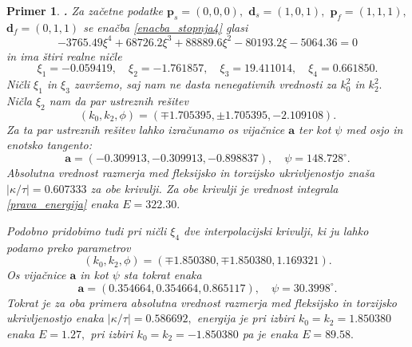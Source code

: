 \documentclass[12pt,a4paper,twoside]{article}
\theoremstyle{definition} %
\theoremstyle{plain} %
\theoremstyle{primerstyle}
\newtheorem{primer}[definicija]{Primer}
\numberwithin{equation}{section}  %
\newcommand{\aV}{\mathbf{a}}
\newcommand{\dV}{\mathbf{d}}
\newcommand{\pV}{\mathbf{p}}
\begin{document}
\begin{primer}
	\label{interpolacija_primer}
	\textbf{. }Za začetne podatke $\pV_s=(0,0,0),$ $\dV_s=(1,0,1),$ $\pV_f=(1,1,1),$ $\dV_f=(0,1,1)$ se enačba \eqref{enacba_stopnja4} glasi
	\begin{equation}
		\label{primer_enacbast4}
		-3765.49\xi^4+68726.2\xi^3+88889.6\xi^2-80193.2\xi-5064.36=0
	\end{equation}
	in ima štiri realne ničle
	\begin{equation}
		\label{hermit_nicle}
		\xi_1=-0.059419,\quad\xi_2=-1.761857,\quad\xi_3=19.411014,\quad\xi_4=0.661850.
	\end{equation}
	Ničli $\xi_1$ in $\xi_3$ zavržemo, saj nam ne dasta nenegativnih vrednosti za $k_0^2$ in $k_2^2.$ Ničla $\xi_2$ nam da par ustreznih rešitev
	\begin{equation}
		\label{par_resitev1}
		(k_0,k_2,\phi)=(\mp1.705395,\pm1.705395,-2.109108).
	\end{equation}
	Za ta par ustreznih rešitev lahko izračunamo os vijačnice $\aV$ ter kot $\psi$ med osjo in enotsko tangento:
	\begin{equation}
		\label{par_resitev1_oskot}
		\aV=(-0.309913,-0.309913,-0.898837),\quad\psi=148.728^\circ.
	\end{equation}
	Absolutna vrednost razmerja med fleksijsko in torzijsko ukrivljenostjo znaša $|\kappa/\tau|=0.607333$ za obe krivulji. Za obe krivulji je vrednost integrala \eqref{prava_energija} enaka $E=322.30.$
	
	Podobno pridobimo tudi pri ničli $\xi_4$ dve interpolacijski krivulji, ki ju lahko podamo preko parametrov
	\begin{equation}
		\label{par_resitev2}
		(k_0,k_2,\phi)=(\mp1.850380,\mp1.850380,1.169321).
	\end{equation}
	Os vijačnice $\aV$ in kot $\psi$ sta tokrat enaka
	\begin{equation}
		\label{par_resitev2_oskot}
		\aV=(0.354664,0.354664,0.865117),\quad\psi=30.3998^\circ.
	\end{equation}
	Tokrat je za oba primera absolutna vrednost razmerja med fleksijsko in torzijsko ukrivljenostjo enaka $|\kappa/\tau|=0.586692,$ energija je pri izbiri $k_0=k_2=1.850380$ enaka $E=1.27,$ pri izbiri $k_0=k_2=-1.850380$ pa je enaka $E=89.58.$
	

\end{primer}
\end{document}
